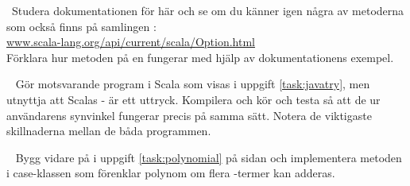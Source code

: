 \SubtaskSolved \TODO



\QUESTEND







\QUESTBEGIN

\Task  \what~Studera dokumentationen för  här och se om du känner igen några av metoderna som också finns på samlingen :\\ \href{http://www.scala-lang.org/api/current/scala/Option.html}{www.scala-lang.org/api/current/scala/Option.html}
\\Förklara hur metoden  på en  fungerar med hjälp av dokumentationens exempel.



\SOLUTION


\TaskSolved \what \TODO


\QUESTEND







\QUESTBEGIN

\Task  \what~ Gör motsvarande program i Scala som visas i uppgift \ref{task:javatry}, men utnyttja att Scalas - är ett uttryck. Kompilera och kör och testa så att de ur användarens synvinkel fungerar precis på samma sätt. Notera de viktigaste skillnaderna mellan de båda programmen.


\SOLUTION


\TaskSolved \what \TODO


\QUESTEND




\QUESTBEGIN

\Task  \what~ Bygg vidare på  i uppgift \ref{task:polynomial} på sidan \pageref{task:polynomial} och implementera metoden  i case-klassen  som förenklar polynom om flera -termer kan adderas.

\SOLUTION


\TaskSolved \what



\QUESTEND





